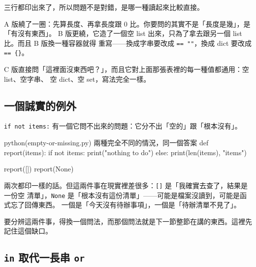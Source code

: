 
三行都印出來了，所以問題不是對錯，是哪一種讀起來比較直接。

A 版繞了一圈：先算長度、再拿長度跟 0 比。你要問的其實不是「長度是幾」，是「有沒有東西」。
B 版更繞，它造了一個空 list 出來，只為了拿去跟另一個 list 比。而且 B 版換一種容器就得
重寫——換成字串要改成 \texttt{== ""}，換成 dict 要改成 \texttt{== \{\}}。

C 版直接問「這裡面沒東西吧？」，而且它對上面那張表裡的每一種值都通用：空 list、空字串、
空 dict、空 set，寫法完全一樣。


\subsection*{一個誠實的例外}

\texttt{if not items:} 有一個它問不出來的問題：它分不出「空的」跟「根本沒有」。

\begin{example}{python}{(empty-or-missing.py) 兩種完全不同的情況，同一個答案}
def report(items):
    if not items:
        print("nothing to do")
    else:
        print(len(items), "items")


report([])
report(None)
\end{example}


兩次都印一樣的話。但這兩件事在現實裡差很多：\texttt{[]} 是「我確實去查了，結果是一份空
清單」，\texttt{None} 是「根本沒有這份清單」——可能是檔案沒讀到，可能是函式忘了回傳東西。
一個是「今天沒有待辦事項」，一個是「待辦清單不見了」。

要分辨這兩件事，得換一個問法，而那個問法就是下一節整節在講的東西。這裡先記住這個缺口。

\subsection*{\texttt{in} 取代一長串 \texttt{or}}

